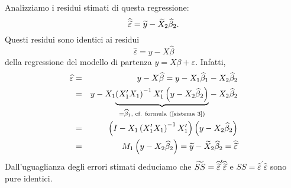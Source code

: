 \documentclass[a4paper]{report}
\theoremstyle{remark}
\begin{document}
\noindent Analizziamo i residui stimati di questa regressione:%
\begin{equation*}
\widehat{\widetilde{\varepsilon }}=\widetilde{y}-\widetilde{X}_{2}\widehat{%
\beta }_{2}.
\end{equation*}%
Questi residui sono identici ai residui%
\begin{equation*}
\widehat{\varepsilon }=y-X\widehat{\beta }
\end{equation*}%
della regressione del modello di partenza $y=X\beta +\varepsilon $. Infatti,%
\begin{eqnarray*}
\widehat{\varepsilon } &=&y-X\widehat{\beta }=y-X_{1}\widehat{\beta }%
_{1}-X_{2}\widehat{\beta }_{2} \\
&=&y-X_{1}\underset{=\widehat{\beta }_{1}\text{, cf. formula (\ref{sistema 3}%
)}}{\underbrace{\left( X_{1}^{\prime }X_{1}\right) ^{-1}X_{1}^{\prime
}\left( y-X_{2}\widehat{\beta }_{2}\right) }}-X_{2}\widehat{\beta }_{2} \\
&=&\left( I-X_{1}\left( X_{1}^{\prime }X_{1}\right) ^{-1}X_{1}^{\prime
}\right) \left( y-X_{2}\widehat{\beta }_{2}\right) \\
&=&M_{1}\left( y-X_{2}\widehat{\beta }_{2}\right) =\widetilde{y}-\widetilde{X%
}_{2}\widehat{\beta }_{2}=\widehat{\widetilde{\varepsilon }}
\end{eqnarray*}%
Dall'uguaglianza degli errori stimati deduciamo che $\widetilde{SS}=\widehat{%
\widetilde{\varepsilon }}^{\prime }\widehat{\widetilde{\varepsilon }}$ e $SS=%
\widehat{\varepsilon }^{\prime }\widehat{\varepsilon }$ sono pure identici.

\bigskip
\end{document}
